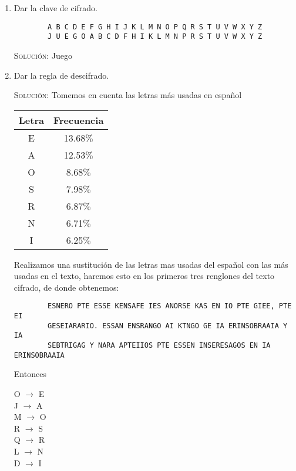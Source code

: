\documentclass[letterpaper,11pt]{article}
\begin{document}
\begin{enumerate}
\begin{enumerate}
        \item Dar la clave de cifrado.
        \begin{verbatim}
        A B C D E F G H I J K L M N O P Q R S T U V W X Y Z
        J U E G O A B C D F H I K L M N P R S T U V W X Y Z
        \end{verbatim}
        
        \textsc{Solución:} Juego

        \item Dar la regla de descifrado.
        
        \textsc{Solución:} Tomemos en cuenta las letras más usadas en español

        \begin{center}
        \begin{tabular}{|c|c|}
        \hline
        Letra & Frecuencia \\
        \hline 
        E & 13.68$\%$ \\ \hline 
        A & 12.53$\%$ \\ \hline 
        O & 8.68$\%$ \\ \hline 
        S & 7.98$\%$ \\ \hline 
        R & 6.87$\%$ \\ \hline 
        N & 6.71$\%$ \\ \hline 
        I & 6.25$\%$ \\ \hline 
        \end{tabular}
        \end{center}
        
        Realizamos una sustitución de las letras mas usadas del español con las
        más usadas en el texto, haremos esto en los primeros tres renglones del 
        texto cifrado, de donde obtenemos:
        
        \begin{verbatim}
        ESNERO PTE ESSE KENSAFE IES ANORSE KAS EN IO PTE GIEE, PTE EI
        GESEIARARIO. ESSAN ENSRANGO AI KTNGO GE IA ERINSOBRAAIA Y IA
        SEBTRIGAG Y NARA APTEIIOS PTE ESSEN INSERESAGOS EN IA ERINSOBRAAIA
        \end{verbatim}
        
        Entonces
        \begin{center}
            O $\rightarrow$ E \\
            J $\rightarrow$ A \\
            M $\rightarrow$ O \\
            R $\rightarrow$ S \\
            Q $\rightarrow$ R \\
            L $\rightarrow$ N \\
            D $\rightarrow$ I
        \end{center}
        

\end{enumerate}
\end{enumerate}
\end{document}
